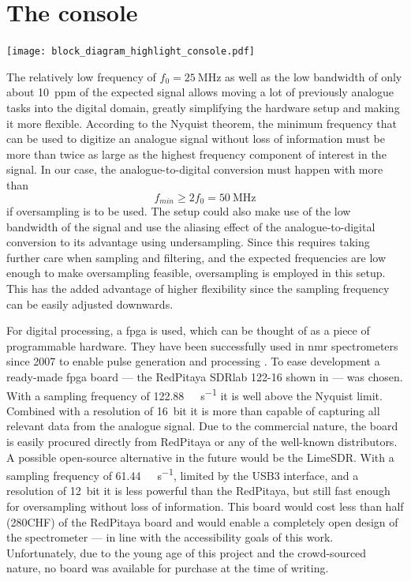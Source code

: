 \section{The console}
\begin{marginfigure}
    \texttt{[image: block\_diagram\_highlight\_console.pdf]}
\end{marginfigure}

The relatively low frequency of \(f_0 = \qty{25}{\mega\hertz}\) as well as the low bandwidth of only about \qty{10}{ppm} of the expected signal allows moving a lot of previously analogue tasks into the digital domain, greatly simplifying the hardware setup and making it more flexible. According to the Nyquist theorem, the minimum frequency that can be used to digitize an analogue signal without loss of information must be more than twice as large as the highest frequency component of interest in the signal. In our case, the analogue-to-digital conversion must happen with more than
\[
    f_{min} \ge 2f_0 = \qty{50}{\mega\hertz}
\]
if oversampling is to be used. The setup could also make use of the low bandwidth of the signal and use the aliasing effect of the analogue-to-digital conversion to its advantage using undersampling. Since this requires taking further care when sampling and filtering, and the expected frequencies are low enough to make oversampling feasible, oversampling is employed in this setup. This has the added advantage of higher flexibility since the sampling frequency can be easily adjusted downwards.

For digital processing, a \acrfull{fpga} is used, which can be thought of as a piece of programmable hardware. They have been successfully used in \acrshort{nmr} spectrometers since 2007 to enable pulse generation and processing . To ease development a ready-made \acrshort{fpga} board --- the RedPitaya SDRlab 122-16 shown in  --- was chosen. With a sampling frequency of \qty{122.88}{\mega\sample\per\second} it is well above the Nyquist limit. Combined with a resolution of \qty{16}{bit} it is more than capable of capturing all relevant data from the analogue signal. Due to the commercial nature, the board is easily procured directly from RedPitaya or any of the well-known distributors. A possible open-source alternative in the future would be the LimeSDR. With a sampling frequency of \qty{61.44}{\mega\sample\per\second}, limited by the USB3 interface, and a resolution of \qty{12}{bit} it is less powerful than the RedPitaya, but still fast enough for oversampling without loss of information. This board would cost less than half (\approx 280CHF) of the RedPitaya board and would enable a completely open design of the spectrometer --- in line with the accessibility goals of this work. Unfortunately, due to the young age of this project and the crowd-sourced nature, no board was available for purchase at the time of writing.

